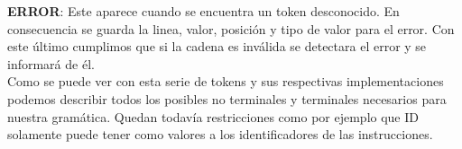 \newline
\textbf{ERROR}: Este aparece cuando se encuentra un token desconocido. En consecuencia se guarda la linea, valor, posición y
tipo de valor para el error. Con este último cumplimos que si la cadena es inválida se detectara el error y se informará de él.\\
\newline
Como se puede ver con esta serie de tokens y sus respectivas implementaciones podemos describir todos los posibles no terminales y terminales
necesarios para nuestra gramática. Quedan todavía restricciones como por ejemplo que ID solamente puede tener como valores a los
identificadores de las instrucciones.\\
